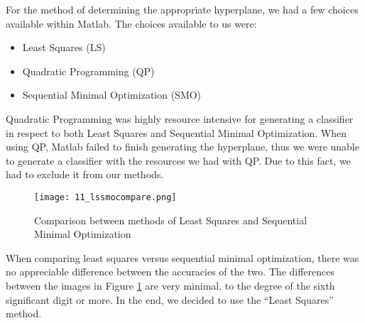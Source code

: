 For the method of determining the appropriate hyperplane, we had a few choices available within Matlab. The choices available to us were:

\begin{itemize}
  \item Least Squares (LS)
  \item Quadratic Programming (QP)
  \item Sequential Minimal Optimization (SMO)
\end{itemize}

Quadratic Programming was highly resource intensive for generating a classifier in respect to both Least Squares and Sequential Minimal Optimization. When using QP, Matlab failed to finish generating the hyperplane, thus we were unable to generate a classifier with the resources we had with QP. Due to this fact, we had to exclude it from our methods.

\begin{figure}[ht]
    \centering
    \texttt{[image: 11\_lssmocompare.png]}
    \caption{Comparison between methods of Least Squares and Sequential Minimal Optimization}
    \label{fig:11_lssmocompare}
\end{figure}

When comparing least squares versus sequential minimal optimization, there was no appreciable difference between the accuracies of the two. The differences between the images in Figure \ref{fig:11_lssmocompare} are very minimal, to the degree of the sixth significant digit or more. In the end, we decided to use the ``Least Squares'' method.

